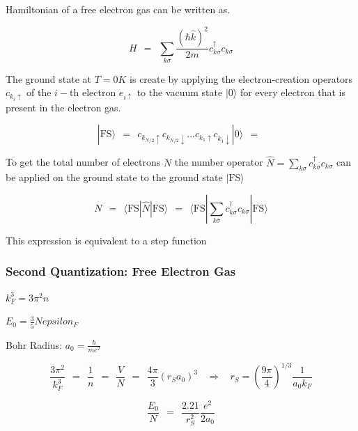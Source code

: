\documentclass[10pt]{report}
\numberwithin{equation}{chapter}
\begin{document}
Hamiltonian of a free electron gas can be written as. 

\begin{equation}
  H ~~=~~ \sum_{k \sigma} \frac{(\hbar \hat{k})^2}{2m} c_{k \sigma}^\dag c_{k \sigma}
\end{equation}


The ground state at $T=0K$ is create by applying the electron-creation operators $c_{k_i \uparrow}$ of the $i-\text{th}$ electron $e_{i \uparrow}$ to the vacuum state $|0\rangle$ for every electron that is present in the electron gas. 

\begin{equation}
  | \text{FS} \rangle ~~=~~ c_{k_{N/2} \uparrow} c_{k_{N/2} \downarrow} ... c_{k_1 \uparrow} c_{k_1 \downarrow} | 0 \rangle ~~=~~   
\end{equation}

To get the total number of electrons $N$ the number operator $\hat{N} = \sum_{k \sigma} c_{k\sigma}^\dag c_{k\sigma}$ can be applied on the ground state to the ground state $| \text{FS} \rangle$

\begin{equation}
  N ~~=~~ \langle \text{FS} | \hat{N} | \text{FS} \rangle 
    ~~=~~ \langle \text{FS} | \sum_{k\sigma} c_{k\sigma}^\dag c_{k\sigma} | \text{FS} \rangle
\end{equation} 

This expression is equivalent to a step function 



\subsubsection*{Second Quantization: Free Electron Gas} %

$ k_F^3 = 3 \pi^2 n$

$ E_0 = \frac{3}{5} N epsilon_F$

Bohr Radius: $a_0 = \frac{\hbar}{m e^2}$

\begin{equation*}
\frac{3 \pi^2}{k_F^3} ~~ = ~~ \frac{1}{n} ~~ = ~~ \frac{V}{N} ~~ = ~~ \frac{4\pi}{3} \left(r_S a_0 \right)^3 ~~~~ \Rightarrow ~~~~ r_S = \left( \frac{9\pi}{4} \right)^{1/3} \frac{1}{a_0 k_F}
\end{equation*}

\begin{equation*}
\frac{E_0}{N} ~~ = ~~ \frac{2.21}{r_S^2} \frac{e^2}{2a_0}
\end{equation*}
\end{document}
